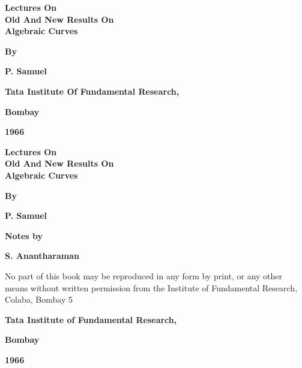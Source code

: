 \thispagestyle{empty}
\begin{center}
  \textbf{\Large Lectures On}\\[5pt]
  \textbf{\Large Old And New Results On}\\[5pt]
  \textbf{\Large Algebraic Curves}
  \vskip 1cm

  {\bf By}
  \medskip

  {\large\bf P. Samuel}
  \vfill

  {\bf Tata Institute Of Fundamental Research,}

  {\bf Bombay}

  {\bf 1966}
\end{center}

\eject


\thispagestyle{empty}
\begin{center}
  \textbf{\Large Lectures On}\\[5pt]
  \textbf{\Large Old And New Results On}\\[5pt]
  \textbf{\Large Algebraic Curves}
  \vskip 1cm


{\bf By}\\
 \medskip

{\large\bf P. Samuel}
\vfill

{\bf  Notes by}
\medskip

{\large\bf  S. Anantharaman}
\vfill

\parbox{0.7\textwidth}{No part of this book may be reproduced in any form by print,
or any other means without written permission from the
Institute of Fundamental Research, Colaba, Bombay 5} 

  \vfill
{\bf  Tata Institute of Fundamental Research,}

{\bf   Bombay}

{\bf  1966}
\end{center}

\eject

